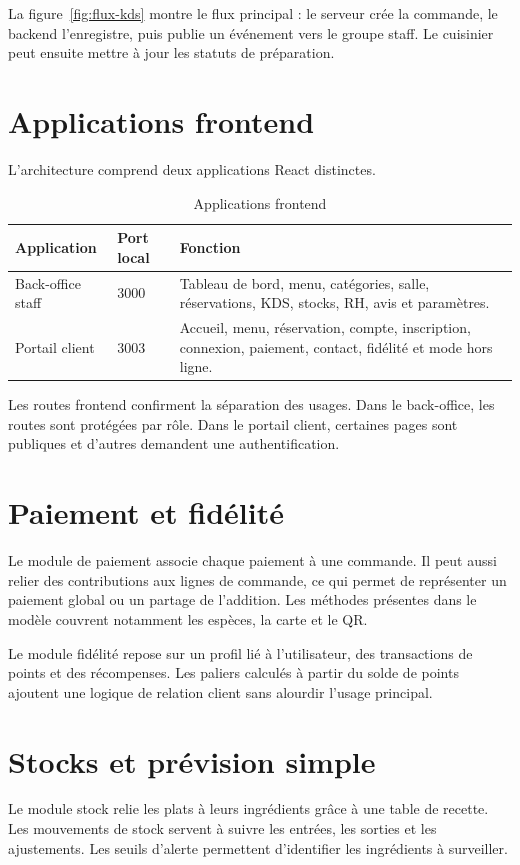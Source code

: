 La figure~\ref{fig:flux-kds} montre le flux principal : le serveur crée la commande, le backend l'enregistre, puis publie un événement vers le groupe staff. Le cuisinier peut ensuite mettre à jour les statuts de préparation.

\section{Applications frontend}
L'architecture comprend deux applications React distinctes.

\begin{table}[H]
\centering
\caption{Applications frontend}
\label{tab:frontends}
\begin{tabularx}{\textwidth}{p{3.3cm}p{3cm}Y}
\toprule
\textbf{Application} & \textbf{Port local} & \textbf{Fonction} \\
\midrule
Back-office staff & 3000 & Tableau de bord, menu, catégories, salle, réservations, KDS, stocks, RH, avis et paramètres. \\
Portail client & 3003 & Accueil, menu, réservation, compte, inscription, connexion, paiement, contact, fidélité et mode hors ligne. \\
\bottomrule
\end{tabularx}
\end{table}

Les routes frontend confirment la séparation des usages. Dans le back-office, les routes sont protégées par rôle. Dans le portail client, certaines pages sont publiques et d'autres demandent une authentification.

\section{Paiement et fidélité}
Le module de paiement associe chaque paiement à une commande. Il peut aussi relier des contributions aux lignes de commande, ce qui permet de représenter un paiement global ou un partage de l'addition. Les méthodes présentes dans le modèle couvrent notamment les espèces, la carte et le QR.

Le module fidélité repose sur un profil lié à l'utilisateur, des transactions de points et des récompenses. Les paliers calculés à partir du solde de points ajoutent une logique de relation client sans alourdir l'usage principal.

\section{Stocks et prévision simple}
Le module stock relie les plats à leurs ingrédients grâce à une table de recette. Les mouvements de stock servent à suivre les entrées, les sorties et les ajustements. Les seuils d'alerte permettent d'identifier les ingrédients à surveiller.

